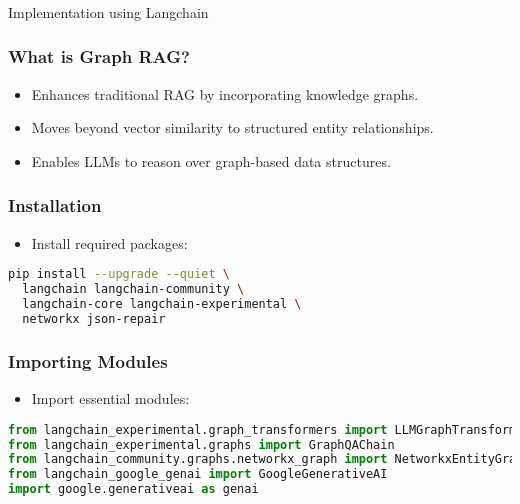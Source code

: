 \begin{frame}[fragile]\frametitle{}
\begin{center}
{\Large Implementation using Langchain}
\end{center}
\end{frame}

\begin{frame}[fragile]\frametitle{What is Graph RAG?}
  \begin{itemize}
    \item Enhances traditional RAG by incorporating knowledge graphs.
    \item Moves beyond vector similarity to structured entity relationships.
    \item Enables LLMs to reason over graph-based data structures.
  \end{itemize}
\end{frame}

\begin{frame}[fragile]\frametitle{Installation}
  \begin{itemize}
    \item Install required packages:
  \end{itemize}
  \begin{lstlisting}[language=bash]
pip install --upgrade --quiet \
  langchain langchain-community \
  langchain-core langchain-experimental \
  networkx json-repair
  \end{lstlisting}
\end{frame}

\begin{frame}[fragile]\frametitle{Importing Modules}
  \begin{itemize}
    \item Import essential modules:
  \end{itemize}
  \begin{lstlisting}[language=python]
from langchain_experimental.graph_transformers import LLMGraphTransformer
from langchain_experimental.graphs import GraphQAChain
from langchain_community.graphs.networkx_graph import NetworkxEntityGraph
from langchain_google_genai import GoogleGenerativeAI
import google.generativeai as genai
  \end{lstlisting}
\end{frame}

